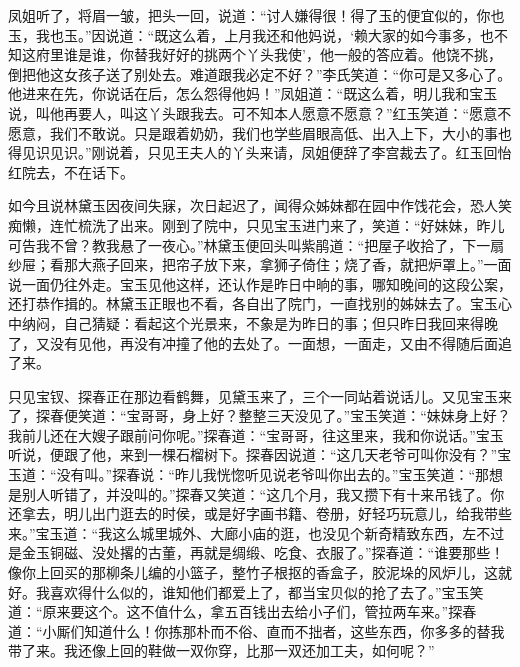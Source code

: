 \documentclass[12pt,oneside]{book}
\begin{document}
凤姐听了，将眉一皱，把头一回，说道：“讨人嫌得很！得了玉的便宜似的，你也玉，我也玉。”因说道：“既这么着，上月我还和他妈说，‘赖大家的如今事多，也不知这府里谁是谁，你替我好好的挑两个丫头我使’，他一般的答应着。他饶不挑，倒把他这女孩子送了别处去。难道跟我必定不好？”李氏笑道：“你可是又多心了。他进来在先，你说话在后，怎么怨得他妈！”凤姐道：“既这么着，明儿我和宝玉说，叫他再要人，叫这丫头跟我去。可不知本人愿意不愿意？”红玉笑道：“愿意不愿意，我们不敢说。只是跟着奶奶，我们也学些眉眼高低、出入上下，大小的事也得见识见识。”刚说着，只见王夫人的丫头来请，凤姐便辞了李宫裁去了。红玉回怡红院去，不在话下。

如今且说林黛玉因夜间失寐，次日起迟了，闻得众姊妹都在园中作饯花会，恐人笑痴懒，连忙梳洗了出来。刚到了院中，只见宝玉进门来了，笑道：“好妹妹，昨儿可告我不曾？教我悬了一夜心。”林黛玉便回头叫紫鹃道：“把屋子收拾了，下一扇纱屉；看那大燕子回来，把帘子放下来，拿狮子倚住；烧了香，就把炉罩上。”一面说一面仍往外走。宝玉见他这样，还认作是昨日中晌的事，哪知晚间的这段公案，还打恭作揖的。林黛玉正眼也不看，各自出了院门，一直找别的姊妹去了。宝玉心中纳闷，自己猜疑：看起这个光景来，不象是为昨日的事；但只昨日我回来得晚了，又没有见他，再没有冲撞了他的去处了。一面想，一面走，又由不得随后面追了来。

只见宝钗、探春正在那边看鹤舞，见黛玉来了，三个一同站着说话儿。又见宝玉来了，探春便笑道：“宝哥哥，身上好？整整三天没见了。”宝玉笑道：“妹妹身上好？我前儿还在大嫂子跟前问你呢。”探春道：“宝哥哥，往这里来，我和你说话。”宝玉听说，便跟了他，来到一棵石榴树下。探春因说道：“这几天老爷可叫你没有？”宝玉道：“没有叫。”探春说：“昨儿我恍惚听见说老爷叫你出去的。”宝玉笑道：“那想是别人听错了，并没叫的。”探春又笑道：“这几个月，我又攒下有十来吊钱了。你还拿去，明儿出门逛去的时侯，或是好字画书籍、卷册，好轻巧玩意儿，给我带些来。”宝玉道：“我这么城里城外、大廊小庙的逛，也没见个新奇精致东西，左不过是金玉铜磁、没处撂的古董，再就是绸缎、吃食、衣服了。”探春道：“谁要那些！像你上回买的那柳条儿编的小篮子，整竹子根抠的香盒子，胶泥垛的风炉儿，这就好。我喜欢得什么似的，谁知他们都爱上了，都当宝贝似的抢了去了。”宝玉笑道：“原来要这个。这不值什么，拿五百钱出去给小子们，管拉两车来。”探春道：“小厮们知道什么！你拣那朴而不俗、直而不拙者，这些东西，你多多的替我带了来。我还像上回的鞋做一双你穿，比那一双还加工夫，如何呢？”
\end{document}

